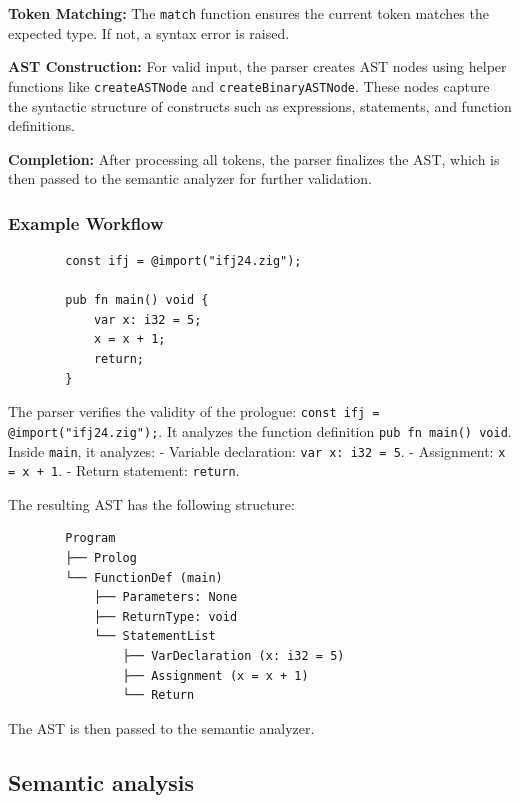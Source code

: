\documentclass[a4paper, 11pt]{article}
\begin{document}
        \textbf{Token Matching:}  
        The \texttt{match} function ensures the current token matches the expected type. If not, a syntax error is raised.
        
        \textbf{AST Construction:}  
        For valid input, the parser creates AST nodes using helper functions like \texttt{createASTNode} and \texttt{createBinaryASTNode}. These nodes capture the syntactic structure of constructs such as expressions, statements, and function definitions.
        
        \textbf{Completion:}  
        After processing all tokens, the parser finalizes the AST, which is then passed to the semantic analyzer for further validation.
        
        
        \subsubsection*{Example Workflow}
        
        \begin{verbatim}
        const ifj = @import("ifj24.zig");
        
        pub fn main() void {
            var x: i32 = 5; 
            x = x + 1;
            return;
        }
        \end{verbatim}
        
        The parser verifies the validity of the prologue: \texttt{const ifj = @import("ifj24.zig");}.  
        It analyzes the function definition \texttt{pub fn main() void}.  
        Inside \texttt{main}, it analyzes:  
        - Variable declaration: \texttt{var x: i32 = 5}.  
        - Assignment: \texttt{x = x + 1}.  
        - Return statement: \texttt{return}.  
        
        The resulting AST has the following structure:  
        
        \begin{verbatim}
        Program
        ├── Prolog
        └── FunctionDef (main)
            ├── Parameters: None
            ├── ReturnType: void
            └── StatementList
                ├── VarDeclaration (x: i32 = 5)
                ├── Assignment (x = x + 1)
                └── Return
        \end{verbatim}
        
        The AST is then passed to the semantic analyzer.

	\subsection{Semantic analysis}
\end{document}

